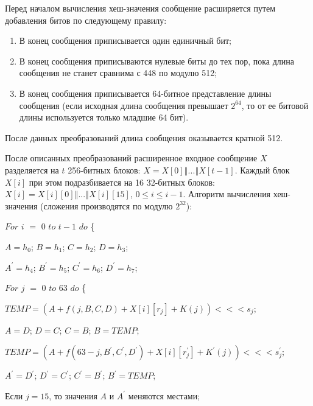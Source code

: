 \documentclass{./civarticle}
\begin{document}
Перед началом вычисления хеш-значения сообщение расширяется путем добавления битов по следующему правилу:

\begin{enumerate}
    \item В конец сообщения приписывается один единичный бит;
    \item В конец сообщения приписываются нулевые биты до тех пор, пока длина сообщения не станет сравнима с 448 по модулю 512;
    \item В конец сообщения приписывается 64-битное представление длины сообщения (если исходная длина сообщения превышает $2^{64}$, то от ее битовой длины используется только младшие 64 бит).
\end{enumerate}
После данных преобразований длина сообщения оказывается кратной 512.

После описанных преобразований расширенное входное сообщение $X$ разделяется на $t$ 256-битных блоков: $X = X[0] \mathbin\Vert ... \mathbin\Vert X[t-1]$. Каждый блок $X[i]$ при этом подразбивается на 16 32-битных блоков: $X[i] = X[i][0] \mathbin\Vert ... \mathbin\Vert X[i][15]$, $0 \leq i \leq i-1$. Алгоритм вычисления хеш-значения (сложения производятся по модулю $2^{32}$):

$For$ $i$ $=$ $0$ $to$ $t - 1$ $do$ \{ 

    \hspace{0.5cm} $A = h_0$; $B = h_1$; $C = h_2$; $D = h_3$;
    
    \hspace{0.5cm} $A^{'} = h_4$; $B^{'} = h_5$; $C^{'} = h_6$; $D^{'} = h_7$;

    \hspace{0.5cm} $For$ $j$ $=$ $0$ $to$ $63$ $do$ \{

    \hspace{1cm} $TEMP = (A + f(j, B, C, D) + X[i][r_j] + K(j)) <<< s_j$;

    \hspace{1cm} $A = D$; $D = C$; $C = B$; $B = TEMP$;

    \hspace{1cm} $TEMP = (A + f(63 - j, B^{'}, C^{'}, D^{'}) + X[i][r^{'}_j] + K^{'}(j)) <<< s_j^{'}$;

    \hspace{1cm} $A^{'} = D^{'}$; $D^{'} = C^{'}$; $C^{'} = B^{'}$; $B^{'} = TEMP$;

    \hspace{1cm} Если $j = 15$, то значения $A$ и $A^{'}$ меняются местами;
\end{document}
